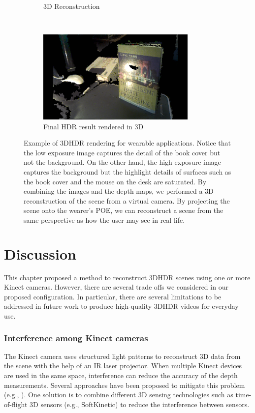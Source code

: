 \begin{figure}[t!]
\begin{subfigure}{0.4\textwidth}
        \caption{3D Reconstruction}
        \label{hdr_result1}
    \end{subfigure}
    ~
    \begin{subfigure}{0.55\textwidth}
	\centering	
	\includegraphics[height=1.8in]{ch4/diagrams/hdr_results/hdr.jpg}
	\caption{Final HDR result rendered in 3D}
	\label{hdr_result2}
    \end{subfigure}
    
    \caption{Example of 3DHDR rendering for wearable applications. Notice that the low exposure image captures the detail of the book cover but not the background. On the other hand, the high exposure image captures the background but the highlight details of surfaces such as the book cover and the mouse on the desk are saturated. By combining the images and the depth maps, we performed a 3D reconstruction of the scene from a virtual camera. By projecting the scene onto the wearer's POE, we can reconstruct a scene from the same perspective as how the user may see in real life.}
\label{fig_3D_HDR_results}
\end{figure}

\section{Discussion}
\label{sec_discussion}
This chapter proposed a method to reconstruct 3DHDR scenes using one or more Kinect cameras. However, there are several trade offs we considered in our proposed configuration. In particular, there are several limitations to be addressed in future work to produce high-quality 3DHDR videos for everyday use.

\subsubsection{Interference among Kinect cameras}
The Kinect camera uses structured light patterns to reconstruct 3D data from the scene with the help of an IR laser projector. When multiple Kinect devices are used in the same space, interference can reduce the accuracy of the depth measurements. Several approaches have been proposed to mitigate this problem (e.g., \cite{maimone2012reducing}). One solution is to combine different 3D sensing technologies such as time-of-flight 3D sensors (e.g., SoftKinetic) to reduce the interference between sensors. 

